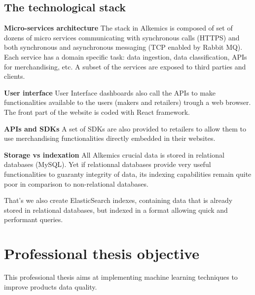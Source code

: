 \subsection{The technological stack}

\textbf{Micro-services architecture}
The stack in Alkemics is composed of set of dozens of micro services communicating with synchronous calls (HTTPS) and both synchronous and asynchronous messaging (TCP enabled by Rabbit MQ).
Each service has a domain specific task: data ingestion, data classification, APIs for merchandising, etc. A subset of the services are exposed to third parties and clients.

\textbf{User interface}
User Interface dashboards also call the APIs to make functionalities available to the users (makers and retailers) trough a web browser.
The front part of the website is coded with React framework.

\textbf{APIs and SDKs}
A set of SDKs are also provided to retailers to allow them to use merchandising functionalities directly embedded in their websites.

\textbf{Storage vs indexation}
All Alkemics crucial data is stored in relational databases (MySQL). Yet if relationnal databases provide very useful functionalities to guaranty integrity of data, its indexing capabilities remain quite poor in comparison to non-relational databases.

That's we also create ElasticSearch indexes, containing data that is already stored in relational databases, but indexed in a format allowing quick and performant queries.


\section{Professional thesis objective}

This professional thesis aims at implementing machine learning techniques to improve products data quality.
